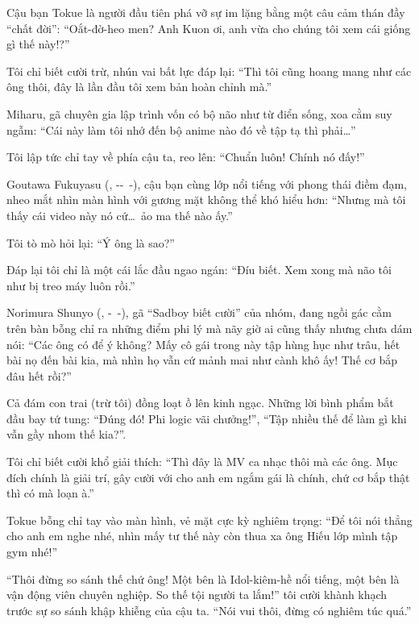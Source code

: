 \documentclass[../main.tex]{subfiles}
\begin{document}
Cậu bạn Tokue là người đầu tiên phá vỡ sự im lặng bằng một câu cảm thán đầy ``chất đời'': ``Oắt-đờ-heo men? Anh Kuon ơi, anh vừa cho chúng tôi xem cái giống gì thế này!?''

Tôi chỉ biết cười trừ, nhún vai bất lực đáp lại: ``Thì tôi cũng hoang mang như các ông thôi, đây là lần đầu tôi xem bản hoàn chỉnh mà.''

Miharu, gã chuyên gia lập trình vốn có bộ não như từ điển sống, xoa cằm suy ngẫm: ``Cái này làm tôi nhớ đến bộ anime nào đó về tập tạ thì phải\dots''

Tôi lập tức chỉ tay về phía cậu ta, reo lên: ``Chuẩn luôn! Chính nó đấy!''

Goutawa Fukuyasu (, --\ -), cậu bạn cùng lớp nổi tiếng với phong thái điềm đạm, nheo mắt nhìn màn hình với gương mặt không thể khó hiểu hơn: ``Nhưng mà tôi thấy cái video này nó cứ\dots\ ảo ma thế nào ấy.''

Tôi tò mò hỏi lại: ``Ý ông là sao?''

Đáp lại tôi chỉ là một cái lắc đầu ngao ngán: ``Đíu biết. Xem xong mà não tôi như bị treo máy luôn rồi.''

Norimura Shunyo (, -\ -), gã ``Sadboy biết cười'' của nhóm, đang ngồi gác cằm trên bàn bỗng chỉ ra những điểm phi lý mà nãy giờ ai cũng thấy nhưng chưa dám nói: ``Các ông có để ý không? Mấy cô gái trong này tập hùng hục như trâu, hết bài nọ đến bài kia, mà nhìn họ vẫn cứ mảnh mai như cành khô ấy! Thế cơ bắp đâu hết rồi?''

Cả đám con trai (trừ tôi) đồng loạt ồ lên kinh ngạc. Những lời bình phẩm bắt đầu bay tứ tung: ``Đúng đó! Phi logic vãi chưởng!'', ``Tập nhiều thế để làm gì khi vẫn gầy nhom thế kia?''.

Tôi chỉ biết cười khổ giải thích: ``Thì đây là MV ca nhạc thôi mà các ông. Mục đích chính là giải trí, gây cười với cho anh em ngắm gái là chính, chứ cơ bắp thật thì có mà loạn à.''

Tokue bỗng chỉ tay vào màn hình, vẻ mặt cực kỳ nghiêm trọng: ``Để tôi nói thẳng cho anh em nghe nhé, nhìn mấy tư thế này còn thua xa ông Hiếu lớp mình tập gym nhé!''

``Thôi đừng so sánh thế chứ ông! Một bên là Idol-kiêm-hề nổi tiếng, một bên là vận động viên chuyên nghiệp. So thế tội người ta lắm!'' tôi cười khành khạch trước sự so sánh khập khiễng của cậu ta. ``Nói vui thôi, đừng có nghiêm túc quá.''
\end{document}
